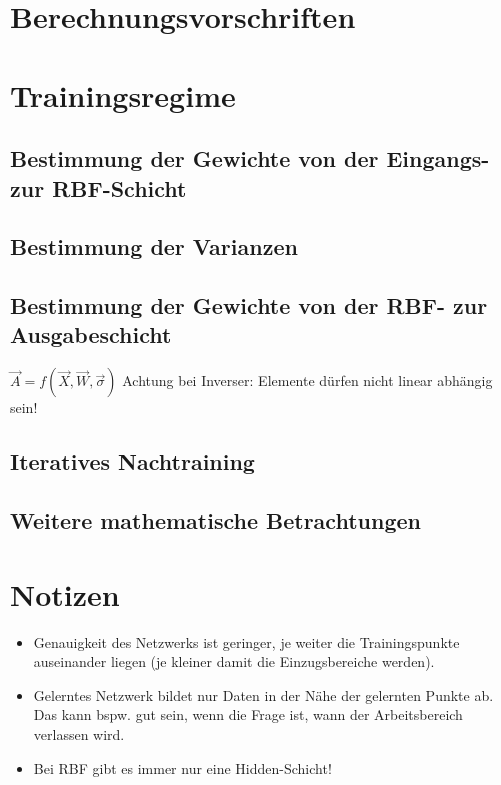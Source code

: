 \section{Berechnungsvorschriften}
\label{berechnung_rbf}
\section{Trainingsregime}

\subsection{Bestimmung der Gewichte von der Eingangs- zur RBF-Schicht}

\subsection{Bestimmung der Varianzen}

\subsection{Bestimmung der Gewichte von der RBF- zur Ausgabeschicht}
$\vec{A}=f(\vec{X}, \vec{W}, \vec{\sigma})$
Achtung bei Inverser: Elemente dürfen nicht linear abhängig sein!

\subsection{Iteratives Nachtraining}

\subsection{Weitere mathematische Betrachtungen}

\section{Notizen}
\begin{itemize}
\item Genauigkeit des Netzwerks ist geringer, je weiter die Trainingspunkte auseinander liegen (je kleiner damit die Einzugsbereiche werden).
\item Gelerntes Netzwerk bildet nur Daten in der Nähe der gelernten Punkte ab. Das kann bspw. gut sein, wenn die Frage ist, wann der Arbeitsbereich verlassen wird.
\item Bei RBF gibt es immer nur eine Hidden-Schicht!
\end{itemize}

